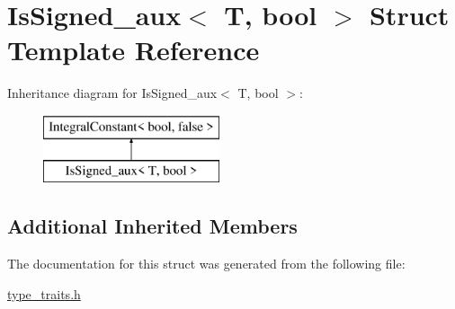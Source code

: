 \hypertarget{struct_is_signed__aux}{}\section{Is\+Signed\+\_\+aux$<$ T, bool $>$ Struct Template Reference}
\label{struct_is_signed__aux}
Inheritance diagram for Is\+Signed\+\_\+aux$<$ T, bool $>$\+:\begin{figure}[H]
\begin{center}
\leavevmode
\includegraphics[height=2.000000cm]{struct_is_signed__aux}
\end{center}
\end{figure}
\subsection*{Additional Inherited Members}


The documentation for this struct was generated from the following file\+:\begin{DoxyCompactItemize}
\item 
\hyperlink{type__traits_8h}{type\+\_\+traits.\+h}\end{DoxyCompactItemize}
